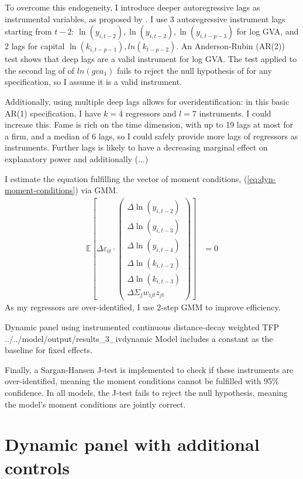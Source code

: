 \par
To overcome this endogeneity, I introduce deeper autoregressive lags as instrumental variables,
as proposed by \citep{Anderson1981}.
I use 3 autoregressive instrument lags starting from $t-2$:
$\ln(y_{i,t-2}), \ln(y_{i,t-2}), \ln(y_{i,t-p-3})$ for log GVA,
and 2 lags for capital $\ln(k_{i,t-p-1}), ln(k_{t-p-2})$.
An Anderson-Rubin (AR(2)) test shows that deep lags are a valid instrument for log GVA.
The test applied to the second lag of of $ln(gva_1)$
fails to reject the null hypothesis of for any specification,
so I assume it is a valid instrument.
\par
Additionally, using multiple deep lags allows for overidentification:
in this basic AR(1) specification, I have $k=4$ regressors and $l=7$ instruments.
I could increase this. Fame is rich on the time dimension, with up to 19 lags at most for a firm,
and a median of 6 lags, so I could safely provide more lags of regressors as instruments.
Further lags is likely to have a decreasing marginal effect on explanatory power
and additionally \todo(...)

\par
I estimate the equation fulfilling the vector of moment conditions,
(\ref{eq:dyn-moment-conditions}) via GMM.
\begin{align}
    \label{eq:dyn-moment-conditions}
    \mathbb E \left[
        \Delta\varepsilon_{it}
        \cdot
        \begin{pmatrix}
            \Delta \ln(y_{i,t-2})     \\
            \Delta \ln(y_{i,t-3})     \\
            \Delta \ln(y_{i,t-4})     \\
            \Delta \ln(k_{i,t-2})     \\
            \Delta \ln(k_{i,t-3})     \\
            \Delta \Sigma_jw_{ijt}z_{jt}
        \end{pmatrix}
    \right]
    &= 0
\end{align}
As my regressors are over-identified, I use 2-step GMM to improve efficiency.
 
\wraptable
    {Dynamic panel using instrumented continuous distance-decay weighted TFP}
    {../../model/output/results_3_ivdynamic}
    {
        Model includes a constant as the baseline for  fixed effects.
    }

\par 
Finally, a Sargan-Hansen J-test is implemented to check if these instruments are 
over-identified, meaning the moment conditions cannot be fulfilled with 95\% confidence.
In all models, the J-test fails to reject the null hypothesis,
meaning the model's moment conditions are jointly correct.

\section{Dynamic panel with additional controls}
\label{ss:model-dyn-controls}